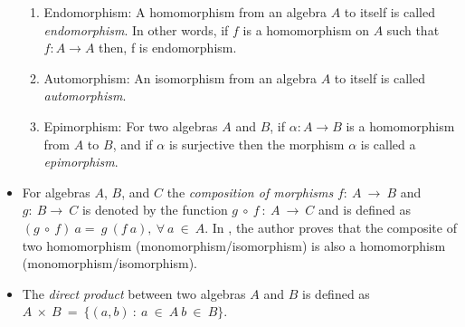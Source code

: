 \begin{itemize}
\begin{enumerate}
        \item Endomorphism: A homomorphism from an algebra $A$ to itself is
        called \textit{endomorphism}. In other words, if $f$ is a homomorphism on $A$
        such that $f:A\rightarrow A$ then, f is endomorphism.

        \item Automorphism: An isomorphism from an algebra $A$ to itself is
        called \textit{automorphism}.

        \item Epimorphism: For two algebras $A$ and $B$, if \(\alpha : A
        \rightarrow B \) is a homomorphism from $A$ to $B$, and if \(\alpha\) is
        surjective then the morphism \(\alpha\) is called a
        \textit{epimorphism}.
    \end{enumerate}

    \item For algebras $A$, $B$, and $C$ the \textit{composition of morphisms}
    $f:\ A \ \rightarrow \ B$ and $g:\ B \rightarrow\ C$ is denoted by the
    function $g\ \circ \ f\ :\ A\ \rightarrow \ C$ and is defined as $(g\ \circ \
    f)\ a = \ g\ (f\ a), \ \forall \ a\ \in\ A$. In \cite{sankappanavar1981course},
    the author proves that the composite of two homomorphism
    (monomorphism/isomorphism) is also a homomorphism
    (monomorphism/isomorphism).

    \item The \textit{direct product} between two algebras $A$ and $B$ is
    defined as $A\ \times\ B\ =\ \{ (a,b)\ :\ a \ \in \ A\ b \ \in \ B \}$.
\end{itemize}
